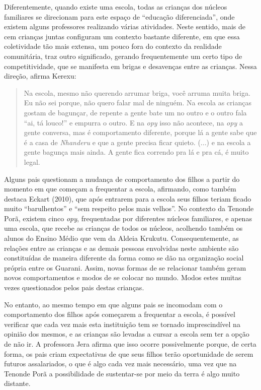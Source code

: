Diferentemente, quando existe uma escola, todas as crianças dos núcleos
familiares se direcionam para este espaço de ``educação diferenciada'',
onde existem alguns professores realizando várias atividades. Neste
sentido, mais de cem crianças juntas configuram um contexto bastante
diferente, em que essa coletividade tão mais extensa, um pouco fora do
contexto da realidade comunitária, traz outro significado, gerando
frequentemente um certo tipo de competitividade, que se manifesta em
brigas e desavenças entre as crianças. Nessa direção, afirma Kerexu:

\begin{quote}
Na escola, mesmo não querendo arrumar briga, você arruma muita briga. Eu
não sei porque, não quero falar mal de ninguém. Na escola as crianças
gostam de bagunçar, de repente a gente bate um no outro e o outro fala
``ai, tá louco!'' e empurra o outro. E na \emph{opy} isso não acontece,
na \emph{opy} a gente conversa, mas é comportamento diferente, porque lá
a gente sabe que é a casa de \emph{Nhanderu} e que a gente precisa ficar
quieto. (...) e na escola a gente bagunça mais ainda. A gente fica
correndo pra lá e pra cá, é muito legal.
\end{quote}

Alguns pais questionam a mudança de comportamento dos filhos a partir do
momento em que começam a frequentar a escola, afirmando, como também
destaca Eckart (2010), que após entrarem para a escola seus filhos
teriam ficado muito ``barulhentos'' e ``sem respeito pelos mais
velhos''. No contexto da Tenonde Porã, existem cinco \emph{opy},
frequentadas por diferentes núcleos familiares, e apenas uma escola, que
recebe as crianças de todos os núcleos, acolhendo também os alunos do
Ensino Médio que vem da Aldeia Krukutu. Consequentemente, as relações
entre as crianças e as demais pessoas envolvidas neste ambiente são
constituídas de maneira diferente da forma como se dão na organização
social própria entre os Guarani. Assim, novas formas de se relacionar
também geram novos comportamentos e modos de se colocar no mundo. Modos
estes muitas vezes questionados pelos pais destas crianças.

No entanto, ao mesmo tempo em que alguns pais se incomodam com o
comportamento dos filhos após começarem a frequentar a escola, é
possível verificar que cada vez mais esta instituição tem se tornado
imprescindível na opinião dos mesmos, e as crianças são levadas a cursar
a escola sem ter a opção de não ir. A professora Jera afirma que isso
ocorre possivelmente porque, de certa forma, os pais criam expectativas
de que seus filhos terão oportunidade de serem futuros assalariados, o
que é algo cada vez mais necessário, uma vez que na Tenonde Porã a
possibilidade de sustentar-se por meio da terra é algo muito distante.

